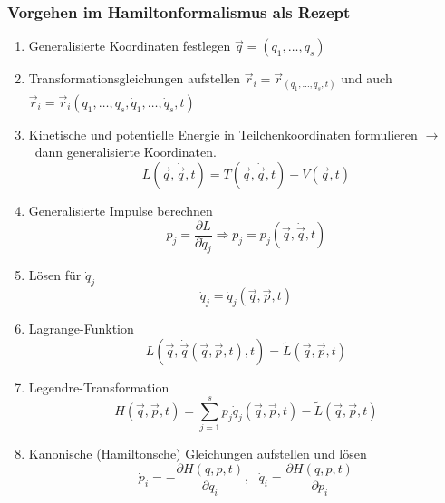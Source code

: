 \documentclass[oneside]{book}
\theoremstyle{definition}
\newcommand{\conseq}{$\rightarrow$~}
\newcommand{\ffpartial}[2]{\frac{\partial #1}{\partial #2}}
\newcommand{\dotvec}[1]{\dot{\vec{#1}}}
\begin{document}
\subsubsection{Vorgehen im Hamiltonformalismus als Rezept}
\begin{enumerate}
	\item Generalisierte Koordinaten festlegen $\vec{q} = (q_1, \dots, q_s)$
	\item Transformationsgleichungen aufstellen $\vec{r}_i = \vec{r}_(q_1, \dots, q_s, t)$ und auch $\dotvec{r}_i = \dotvec{r}_i(q_1, \dots, q_s, \dot{q}_1, \dots, \dot{q}_s, t)$
	\item Kinetische und potentielle Energie in Teilchenkoordinaten formulieren \conseq dann generalisierte Koordinaten.
	$$L(\vec{q}, \dotvec{q}, t) = T(\vec{q}, \dotvec q,t)  - V(\vec{q}, t)$$
	\item Generalisierte Impulse berechnen
		$$p_j = \ffpartial{L}{\dot{q}_j} \Rightarrow p_j = p_j(\vec{q}, \dotvec{q}, t)$$
	\item Lösen für $\dot{q}_j$
	$$\dot{q}_j = \dot{q}_j (\vec{q}, \vec{p}, t)$$
	\item Lagrange-Funktion
	$$L(\vec{q}, \dotvec{q}(\vec{q}, \vec{p}, t), t) = \tilde{L}(\vec{q}, \vec{p}, t)$$
	\item Legendre-Transformation
	$$H(\vec{q}, \vec{p}, t) = \sum_{j=1}^s p_j \dot{q}_j(\vec{q}, \vec{p}, t) - \tilde{L}(\vec{q}, \vec{p}, t)$$
	\item Kanonische (Hamiltonsche) Gleichungen aufstellen und lösen
	$$\dot{p}_i = -\ffpartial{H(q,p,t)}{q_i},~~~ \dot{q}_i = \ffpartial{H(q,p,t)}{p_i}$$
\end{enumerate}
\end{document}
